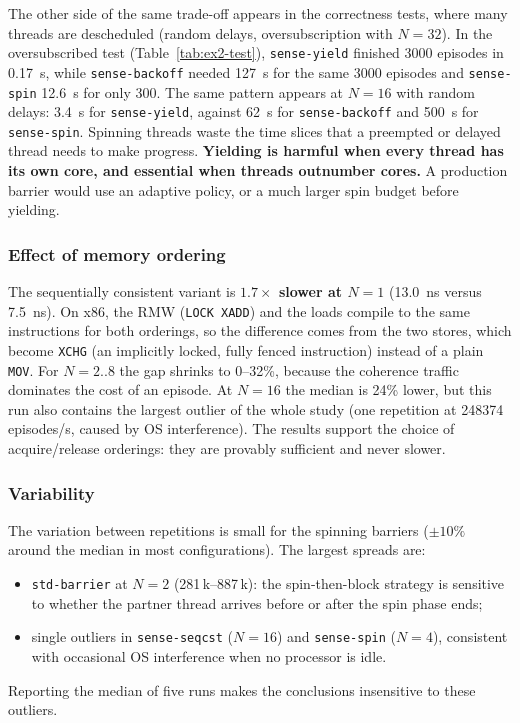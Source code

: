 The other side of the same trade-off appears in the correctness tests,
where many threads are descheduled (random delays, oversubscription with
$N=32$). In the oversubscribed test (Table~\ref{tab:ex2-test}),
\texttt{sense-yield} finished 3000 episodes in \SI{0.17}{\second}, while
\texttt{sense-backoff} needed \SI{127}{\second} for the same 3000 episodes
and \texttt{sense-spin} \SI{12.6}{\second} for only 300. The same pattern
appears at $N=16$ with random delays: \SI{3.4}{\second} for
\texttt{sense-yield}, against \SI{62}{\second} for \texttt{sense-backoff}
and \SI{500}{\second} for \texttt{sense-spin}. Spinning threads waste the
time slices that a preempted or delayed thread needs to make progress. \textbf{Yielding is harmful when
every thread has its own core, and essential when threads outnumber
cores.} A production barrier would use an adaptive policy, or a much larger
spin budget before yielding.

\subsubsection{Effect of memory ordering}

The sequentially consistent variant is \textbf{$1.7\times$ slower at $N=1$}
(\SI{13.0}{\nano\second} versus \SI{7.5}{\nano\second}). On x86, the RMW
(\texttt{LOCK XADD}) and the loads compile to the same instructions for
both orderings, so the difference comes from the two stores, which become
\texttt{XCHG} (an implicitly locked, fully fenced instruction) instead of
a plain \texttt{MOV}. For $N=2..8$ the gap shrinks to 0--32\%, because the
coherence traffic dominates the cost of an episode. At $N=16$ the median is
24\% lower, but this run also contains the largest outlier of the whole
study (one repetition at \num{248374} episodes/s, caused by OS
interference). The results support the choice of acquire/release
orderings: they are provably sufficient and never slower.

\subsubsection{Variability}

The variation between repetitions is small for the spinning barriers
($\pm 10\%$ around the median in most configurations). The largest
spreads are:
\begin{itemize}
    \item \texttt{std-barrier} at $N=2$ (\num{281}\,k--\num{887}\,k): the
          spin-then-block strategy is sensitive to whether the partner
          thread arrives before or after the spin phase ends;
    \item single outliers in \texttt{sense-seqcst} ($N=16$) and
          \texttt{sense-spin} ($N=4$), consistent with occasional OS
          interference when no processor is idle.
\end{itemize}
Reporting the median of five runs makes the conclusions insensitive to
these outliers.

